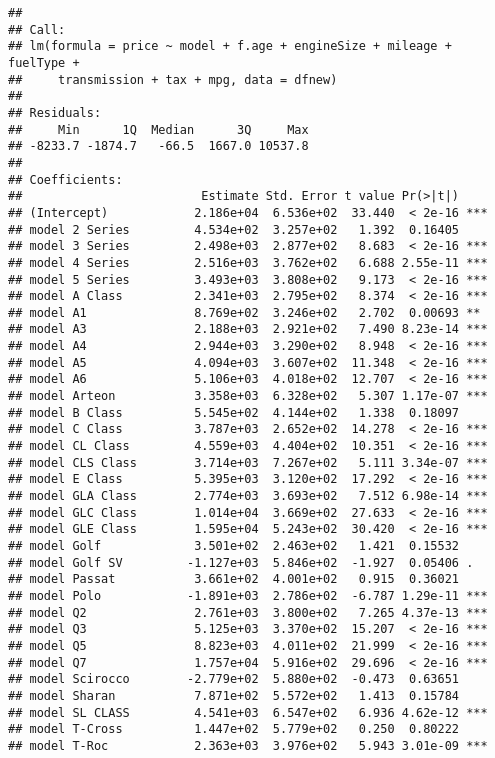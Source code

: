 \documentclass[
]{article}
\begin{document}
\begin{verbatim}
## 
## Call:
## lm(formula = price ~ model + f.age + engineSize + mileage + fuelType + 
##     transmission + tax + mpg, data = dfnew)
## 
## Residuals:
##     Min      1Q  Median      3Q     Max 
## -8233.7 -1874.7   -66.5  1667.0 10537.8 
## 
## Coefficients:
##                         Estimate Std. Error t value Pr(>|t|)    
## (Intercept)            2.186e+04  6.536e+02  33.440  < 2e-16 ***
## model 2 Series         4.534e+02  3.257e+02   1.392  0.16405    
## model 3 Series         2.498e+03  2.877e+02   8.683  < 2e-16 ***
## model 4 Series         2.516e+03  3.762e+02   6.688 2.55e-11 ***
## model 5 Series         3.493e+03  3.808e+02   9.173  < 2e-16 ***
## model A Class          2.341e+03  2.795e+02   8.374  < 2e-16 ***
## model A1               8.769e+02  3.246e+02   2.702  0.00693 ** 
## model A3               2.188e+03  2.921e+02   7.490 8.23e-14 ***
## model A4               2.944e+03  3.290e+02   8.948  < 2e-16 ***
## model A5               4.094e+03  3.607e+02  11.348  < 2e-16 ***
## model A6               5.106e+03  4.018e+02  12.707  < 2e-16 ***
## model Arteon           3.358e+03  6.328e+02   5.307 1.17e-07 ***
## model B Class          5.545e+02  4.144e+02   1.338  0.18097    
## model C Class          3.787e+03  2.652e+02  14.278  < 2e-16 ***
## model CL Class         4.559e+03  4.404e+02  10.351  < 2e-16 ***
## model CLS Class        3.714e+03  7.267e+02   5.111 3.34e-07 ***
## model E Class          5.395e+03  3.120e+02  17.292  < 2e-16 ***
## model GLA Class        2.774e+03  3.693e+02   7.512 6.98e-14 ***
## model GLC Class        1.014e+04  3.669e+02  27.633  < 2e-16 ***
## model GLE Class        1.595e+04  5.243e+02  30.420  < 2e-16 ***
## model Golf             3.501e+02  2.463e+02   1.421  0.15532    
## model Golf SV         -1.127e+03  5.846e+02  -1.927  0.05406 .  
## model Passat           3.661e+02  4.001e+02   0.915  0.36021    
## model Polo            -1.891e+03  2.786e+02  -6.787 1.29e-11 ***
## model Q2               2.761e+03  3.800e+02   7.265 4.37e-13 ***
## model Q3               5.125e+03  3.370e+02  15.207  < 2e-16 ***
## model Q5               8.823e+03  4.011e+02  21.999  < 2e-16 ***
## model Q7               1.757e+04  5.916e+02  29.696  < 2e-16 ***
## model Scirocco        -2.779e+02  5.880e+02  -0.473  0.63651    
## model Sharan           7.871e+02  5.572e+02   1.413  0.15784    
## model SL CLASS         4.541e+03  6.547e+02   6.936 4.62e-12 ***
## model T-Cross          1.447e+02  5.779e+02   0.250  0.80222    
## model T-Roc            2.363e+03  3.976e+02   5.943 3.01e-09 ***

\end{verbatim}
\end{document}
